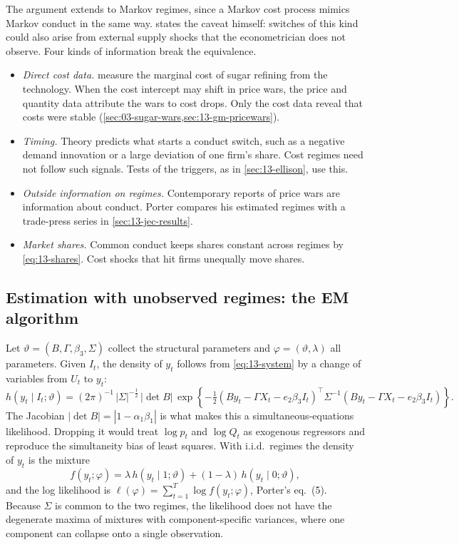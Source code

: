 The argument extends to Markov regimes, since a Markov cost process mimics Markov conduct in the same way.
\citet[p.~302]{Porter1983} states the caveat himself: switches of this kind could also arise from external supply
shocks that the econometrician does not observe. Four kinds of information break the equivalence.
\begin{itemize}
\item \emph{Direct cost data.}  measure the marginal cost of sugar refining from the
technology. When the cost intercept may shift in price wars, the price and quantity data attribute the wars to cost
drops. Only the cost data reveal that costs were stable (\cref{sec:03-sugar-wars,sec:13-gm-pricewars}).
\item \emph{Timing.} Theory predicts what starts a conduct switch, such as a negative demand innovation or a large
deviation of one firm's share. Cost regimes need not follow such signals. Tests of the triggers, as in
\cref{sec:13-ellison}, use this.
\item \emph{Outside information on regimes.} Contemporary reports of price wars are information about conduct.
Porter compares his estimated regimes with a trade-press series in \cref{sec:13-jec-results}.
\item \emph{Market shares.} Common conduct keeps shares constant across regimes by \eqref{eq:13-shares}. Cost shocks
that hit firms unequally move shares.
\end{itemize}

\subsection{Estimation with unobserved regimes: the EM algorithm}\label{sec:13-em}

Let $\vartheta = (B, \Gamma, \beta_3, \Sigma)$ collect the structural parameters and $\varphi = (\vartheta, \lambda)$
all parameters. Given $I_t$, the density of $y_t$ follows from \eqref{eq:13-system} by a change of variables from
$U_t$ to $y_t$:
\begin{equation}\label{eq:13-h}
  h(y_t \mid I_t; \vartheta) = (2\pi)^{-1}\,|\Sigma|^{-\frac{1}{2}}\,|\det B|\,
  \exp\left\{-\tfrac{1}{2}\left(By_t - \Gamma X_t - e_2\beta_3 I_t\right)^\top \Sigma^{-1}
  \left(By_t - \Gamma X_t - e_2\beta_3 I_t\right)\right\}.
\end{equation}
The Jacobian $|\det B| = |1 - \alpha_1\beta_1|$ is what makes this a simultaneous-equations likelihood. Dropping it
would treat $\log p_t$ and $\log Q_t$ as exogenous regressors and reproduce the simultaneity bias of least squares.
With i.i.d.\ regimes the density of $y_t$ is the mixture
\begin{equation}\label{eq:13-mixture}
  f(y_t; \varphi) = \lambda\, h(y_t \mid 1; \vartheta) + (1 - \lambda)\, h(y_t \mid 0; \vartheta),
\end{equation}
and the log likelihood is $\ell(\varphi) = \sum_{t=1}^T \log f(y_t; \varphi)$, Porter's eq.~(5). Because $\Sigma$ is
common to the two regimes, the likelihood does not have the degenerate maxima of mixtures with component-specific
variances, where one component can collapse onto a single observation.


